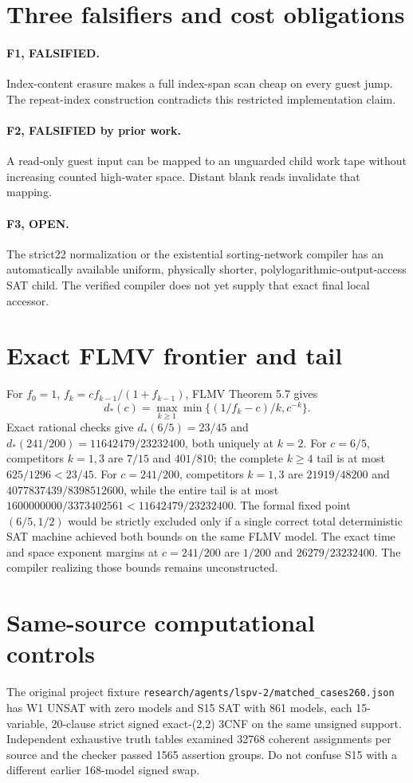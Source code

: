\documentclass[11pt]{article}
\begin{document}
\section*{Three falsifiers and cost obligations}
\paragraph{F1, FALSIFIED.} Index-content erasure makes a full index-span scan cheap on every guest jump. The repeat-index construction contradicts this restricted implementation claim.
\paragraph{F2, FALSIFIED by prior work.} A read-only guest input can be mapped to an unguarded child work tape without increasing counted high-water space. Distant blank reads invalidate that mapping.
\paragraph{F3, OPEN.} The strict22 normalization or the existential sorting-network compiler has an automatically available uniform, physically shorter, polylogarithmic-output-access SAT child. The verified compiler does not yet supply that exact final local accessor.

\section*{Exact FLMV frontier and tail}
For $f_0=1$, $f_k=cf_{k-1}/(1+f_{k-1})$, FLMV Theorem 5.7 gives
\[
d_*(c)=\max_{k\ge1}\min\{(1/f_k-c)/k,c^{-k}\}.
\]
Exact rational checks give $d_*(6/5)=23/45$ and $d_*(241/200)=11642479/23232400$, both uniquely at $k=2$. For $c=6/5$, competitors $k=1,3$ are $7/15$ and $401/810$; the complete $k\ge4$ tail is at most $625/1296<23/45$. For $c=241/200$, competitors $k=1,3$ are $21919/48200$ and $4077837439/8398512600$, while the entire tail is at most $1600000000/3373402561<11642479/23232400$. The formal fixed point $(6/5,1/2)$ would be strictly excluded only if a single correct total deterministic SAT machine achieved both bounds on the same FLMV model. The exact time and space exponent margins at $c=241/200$ are $1/200$ and $26279/23232400$. The compiler realizing those bounds remains unconstructed.

\section*{Same-source computational controls}
The original project fixture \texttt{research/agents/lspv-2/matched\_cases260.json} has W1 UNSAT with zero models and S15 SAT with 861 models, each 15-variable, 20-clause strict signed exact-(2,2) 3CNF on the same unsigned support. Independent exhaustive truth tables examined 32768 coherent assignments per source and the checker passed 1565 assertion groups. Do not confuse S15 with a different earlier 168-model signed swap.
\end{document}
